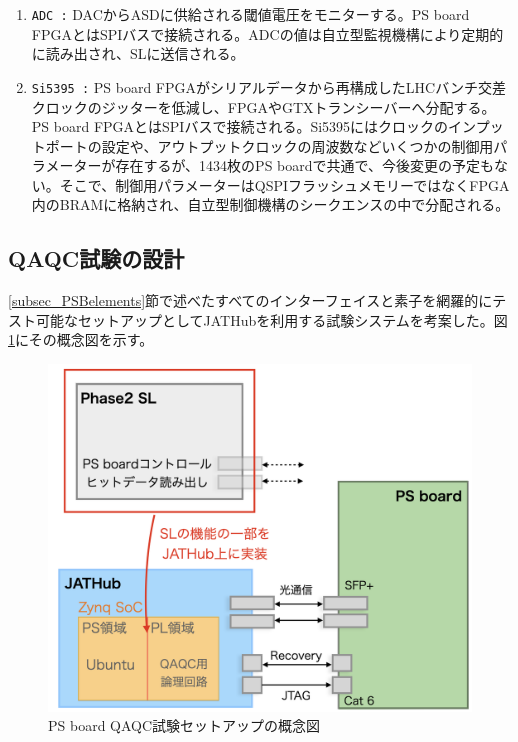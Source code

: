 \begin{enumerate}
    \item  \texttt{ADC :} DACからASDに供給される閾値電圧をモニターする。PS board FPGAとはSPIバスで接続される。ADCの値は自立型監視機構により定期的に読み出され、SLに送信される。
    \baselineskip

    \item \texttt{Si5395 :} PS board FPGAがシリアルデータから再構成したLHCバンチ交差クロックのジッターを低減し、FPGAやGTXトランシーバーへ分配する。PS board FPGAとはSPIバスで接続される。Si5395にはクロックのインプットポートの設定や、アウトプットクロックの周波数などいくつかの制御用パラメーターが存在するが、1434枚のPS boardで共通で、今後変更の予定もない。そこで、制御用パラメーターはQSPIフラッシュメモリーではなくFPGA内のBRAMに格納され、自立型制御機構のシークエンスの中で分配される。
    \baselineskip

\end{enumerate}

\subsection{QAQC試験の設計}
\label{subsec_QAQCdesign}
\ref{subsec_PSBelements}節で述べたすべてのインターフェイスと素子を網羅的にテスト可能なセットアップとしてJATHubを利用する試験システムを考案した。図\ref{PSBtestdesign}にその概念図を示す。

\begin{figure} 
\centering
\includegraphics[width=16cm]{fig/QAQC/PSBtestdesign.png}
\caption[PS board QAQC試験セットアップの概念図]{PS board QAQC試験セットアップの概念図}
\label{PSBtestdesign}
\end{figure}

